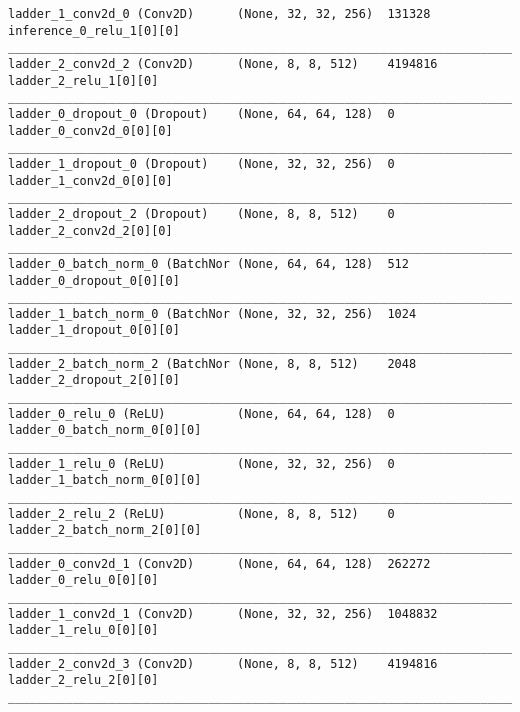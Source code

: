 \begin{lstlisting}[caption={CelebA-VLAE Encoder},captionpos=b,basicstyle=\tiny, label={lst:celeba-vlae-encoder}]
ladder_1_conv2d_0 (Conv2D)      (None, 32, 32, 256)  131328      inference_0_relu_1[0][0]
__________________________________________________________________________________________________
ladder_2_conv2d_2 (Conv2D)      (None, 8, 8, 512)    4194816     ladder_2_relu_1[0][0]
__________________________________________________________________________________________________
ladder_0_dropout_0 (Dropout)    (None, 64, 64, 128)  0           ladder_0_conv2d_0[0][0]
__________________________________________________________________________________________________
ladder_1_dropout_0 (Dropout)    (None, 32, 32, 256)  0           ladder_1_conv2d_0[0][0]
__________________________________________________________________________________________________
ladder_2_dropout_2 (Dropout)    (None, 8, 8, 512)    0           ladder_2_conv2d_2[0][0]
__________________________________________________________________________________________________
ladder_0_batch_norm_0 (BatchNor (None, 64, 64, 128)  512         ladder_0_dropout_0[0][0]
__________________________________________________________________________________________________
ladder_1_batch_norm_0 (BatchNor (None, 32, 32, 256)  1024        ladder_1_dropout_0[0][0]
__________________________________________________________________________________________________
ladder_2_batch_norm_2 (BatchNor (None, 8, 8, 512)    2048        ladder_2_dropout_2[0][0]
__________________________________________________________________________________________________
ladder_0_relu_0 (ReLU)          (None, 64, 64, 128)  0           ladder_0_batch_norm_0[0][0]
__________________________________________________________________________________________________
ladder_1_relu_0 (ReLU)          (None, 32, 32, 256)  0           ladder_1_batch_norm_0[0][0]
__________________________________________________________________________________________________
ladder_2_relu_2 (ReLU)          (None, 8, 8, 512)    0           ladder_2_batch_norm_2[0][0]
__________________________________________________________________________________________________
ladder_0_conv2d_1 (Conv2D)      (None, 64, 64, 128)  262272      ladder_0_relu_0[0][0]
__________________________________________________________________________________________________
ladder_1_conv2d_1 (Conv2D)      (None, 32, 32, 256)  1048832     ladder_1_relu_0[0][0]
__________________________________________________________________________________________________
ladder_2_conv2d_3 (Conv2D)      (None, 8, 8, 512)    4194816     ladder_2_relu_2[0][0]
__________________________________________________________________________________________________

\end{lstlisting}
